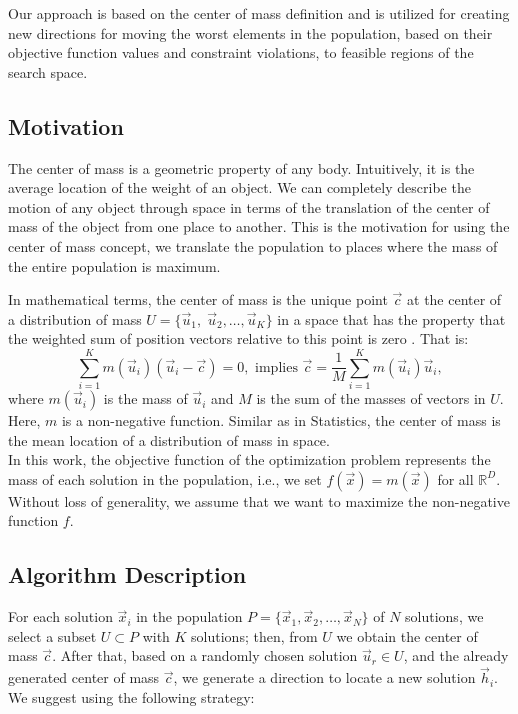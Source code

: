\documentclass[conference]{IEEEtran}
\begin{document}
Our approach is based on the center of mass definition and is utilized for creating new directions for moving the worst  elements in the population, based on their objective function values and constraint violations, to feasible regions of the search space.

%
%
\subsection{Motivation} %
The center of mass is a geometric property of any body. Intuitively, it is the 
average location of the weight of an object. We can completely describe the motion 
of any object through space in terms of the translation of the center of mass of 
the object from one place to another. This is the motivation for using the center of mass
concept, we translate the population to places where the mass of the entire population is
maximum.
% 

In mathematical terms, the center of mass is the unique point $\vec{c}$ at the center of a distribution
of mass $U = \{\vec{u}_1,\; \vec{u}_2 , \ldots , \vec{u}_K \}$ in a space that 
has the property that the weighted sum of position vectors relative to this point 
is zero \cite{kleppner73,serway}. That is:
%
%
\begin{equation}
	\sum_{i = 1}^K m(\vec{u}_i) (\vec{u}_i - \vec{c}) = 0, \text{ implies } 
	\vec{c} = \dfrac{1}{M} \sum_{i = 1}^K  m(\vec{u}_i)  \vec{u}_i,
	\label{eq:masscenter}
\end{equation}
%
%
where $m(\vec{u}_i)$ is the mass of $\vec{u}_i$ and  $M$ is the sum of the 
masses of vectors in $U$. Here, $m$ is a non-negative function. Similar as in Statistics, the center of mass is the mean location of a distribution 
of mass in space.\\


In this work, the objective function of the optimization problem represents 
the mass of each solution in the population,  i.e., we set $f(\vec{x}) = m(\vec{x})$ for all $\mathbb{R}^D$. 
Without loss of generality, we assume that we want to maximize 
the non-negative function $f$.




\subsection{Algorithm Description} %
\label{sub:algorithm_description}

For each solution $\vec{x}_i $ in the population $P = \{ \vec{x}_1, \vec{x}_2, \ldots, \vec{x}_{N} \} $ of $N$ 
solutions, we select a subset $U \subset P $ with $K$ solutions; then, 
from $U$ we obtain the center of mass $\vec{c}$. After that, based on 
a randomly chosen solution $\vec{u}_r \in U$,  
and the already generated center of mass $\vec{c}$, we generate a direction 
to locate a new solution $ \vec{h}_i$. We suggest using the following strategy:
\end{document}
